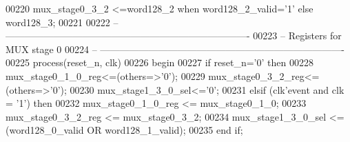 \begin{DoxyCode}
00220 \textcolor{vhdlchar}{mux_stage0_3_2}  \textcolor{vhdlchar}{<=}\textcolor{vhdlchar}{word128_2} \textcolor{keywordflow}{when} \textcolor{vhdlchar}{word128_2_valid}\textcolor{vhdlchar}{=}\textcolor{vhdlchar}{'}\textcolor{vhdllogic}{}\textcolor{vhdllogic}{1}\textcolor{vhdlchar}{'} \textcolor{keywordflow}{else} \textcolor{vhdlchar}{word128_3};
00221 
00222 \textcolor{keyword}{-- ----------------------------------------------------------------------------}
00223 \textcolor{keyword}{-- Registers for MUX stage 0}
00224 \textcolor{keyword}{-- ----------------------------------------------------------------------------  }
00225   \textcolor{keywordflow}{process}(reset_n, clk)
00226 \textcolor{vhdlkeyword}{    begin}
00227       \textcolor{keywordflow}{if} \textcolor{vhdlchar}{reset_n}\textcolor{vhdlchar}{=}\textcolor{vhdlchar}{'}\textcolor{vhdllogic}{}\textcolor{vhdllogic}{0}\textcolor{vhdlchar}{'} \textcolor{keywordflow}{then}
00228             \textcolor{vhdlchar}{mux_stage0_1_0_reg}\textcolor{vhdlchar}{<=}\textcolor{vhdlchar}{(}\textcolor{keywordflow}{others}\textcolor{vhdlchar}{=}\textcolor{vhdlchar}{>}\textcolor{vhdlchar}{'}\textcolor{vhdllogic}{}\textcolor{vhdllogic}{0}\textcolor{vhdlchar}{'}\textcolor{vhdlchar}{)};
00229             \textcolor{vhdlchar}{mux_stage0_3_2_reg}\textcolor{vhdlchar}{<=}\textcolor{vhdlchar}{(}\textcolor{keywordflow}{others}\textcolor{vhdlchar}{=}\textcolor{vhdlchar}{>}\textcolor{vhdlchar}{'}\textcolor{vhdllogic}{}\textcolor{vhdllogic}{0}\textcolor{vhdlchar}{'}\textcolor{vhdlchar}{)};
00230          \textcolor{vhdlchar}{mux_stage1_3_0_sel}\textcolor{vhdlchar}{<=}\textcolor{vhdlchar}{'}\textcolor{vhdllogic}{}\textcolor{vhdllogic}{0}\textcolor{vhdlchar}{'};
00231       \textcolor{keywordflow}{elsif} \textcolor{vhdlchar}{(}\textcolor{vhdlchar}{clk}\textcolor{vhdlchar}{'}\textcolor{vhdlkeyword}{event} \textcolor{keywordflow}{and} \textcolor{vhdlchar}{clk} \textcolor{vhdlchar}{=} \textcolor{vhdlchar}{'}\textcolor{vhdllogic}{}\textcolor{vhdllogic}{1}\textcolor{vhdlchar}{'}\textcolor{vhdlchar}{)} \textcolor{keywordflow}{then}
00232             \textcolor{vhdlchar}{mux_stage0_1_0_reg} \textcolor{vhdlchar}{<=} \textcolor{vhdlchar}{mux_stage0_1_0};
00233             \textcolor{vhdlchar}{mux_stage0_3_2_reg} \textcolor{vhdlchar}{<=} \textcolor{vhdlchar}{mux_stage0_3_2};
00234          \textcolor{vhdlchar}{mux_stage1_3_0_sel} \textcolor{vhdlchar}{<=} \textcolor{vhdlchar}{(}\textcolor{vhdlchar}{word128_0_valid} \textcolor{keywordflow}{OR} \textcolor{vhdlchar}{word128_1_valid}\textcolor{vhdlchar}{)};     
00235         \textcolor{keywordflow}{end} \textcolor{keywordflow}{if};

\end{DoxyCode}
